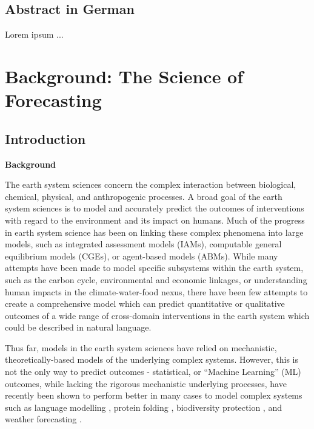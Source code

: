 \documentclass[12pt,a4paper]{article}
\begin{document}
\subsection*{Abstract in German}
Lorem ipsum ...
\clearpage

\setcounter{page}{1}
\tableofcontents
\clearpage

\setcounter{page}{1}





















\section{Background: The Science of Forecasting}
\subsection{Introduction}

\textbf{Background} 

The earth system sciences concern the complex interaction between biological, chemical, physical, and anthropogenic processes. A broad goal of the earth system sciences is to model and accurately predict the outcomes of interventions with regard to the environment and its impact on humans. Much of the progress in earth system science has been on linking these complex phenomena into large models, such as integrated assessment models (IAMs), computable general equilibrium models (CGEs), or agent-based models (ABMs). While many attempts have been made to model specific subsystems within the earth system, such as the carbon cycle, environmental and economic linkages, or understanding human impacts in the climate-water-food nexus, there have been few attempts to create a comprehensive model which can predict quantitative or qualitative outcomes of a wide range of cross-domain interventions in the earth system which could be described in natural language.

Thus far, models in the earth system sciences have relied on mechanistic, theoretically-based models of the underlying complex systems. 
However, this is not the only way to predict outcomes - statistical, or ``Machine Learning'' (ML) outcomes, while lacking the rigorous mechanistic underlying processes, have recently been shown to perform better in many cases to model complex systems such as language modelling , protein folding , biodiversity protection , and weather forecasting .
\end{document}
